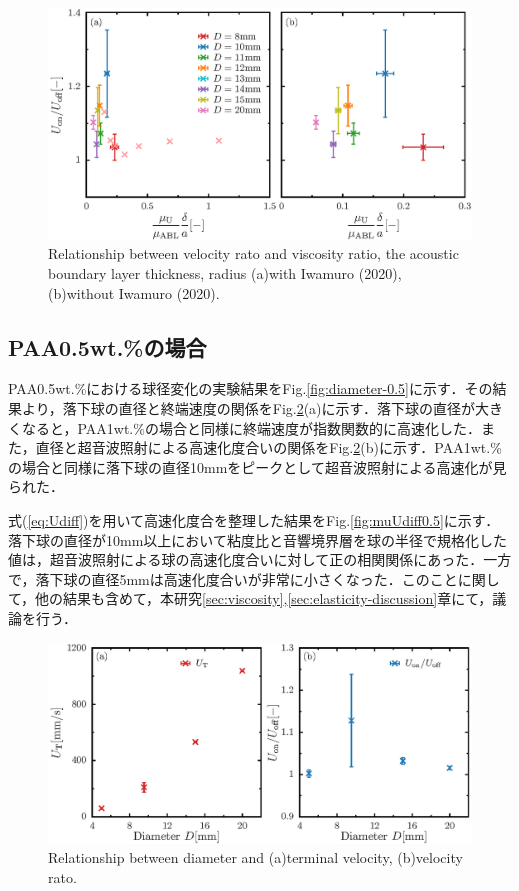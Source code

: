 \begin{figure}[ht]
    \centering
    \includegraphics[width=1\textwidth]{./5-Results/mu_Udiff.eps}
    \caption{Relationship between velocity rato and viscosity ratio, the acoustic boundary layer thickness, radius (a)with Iwamuro (2020), (b)without Iwamuro (2020).}
    \label{fig:muUdiff}
\end{figure}

\newpage

\subsection{PAA0.5wt.\%の場合}
PAA0.5wt.\%における球径変化の実験結果をFig.\ref{fig:diameter-0.5}に示す．その結果より，落下球の直径と終端速度の関係をFig.\ref{fig:diaUT0.5}(a)に示す．落下球の直径が大きくなると，PAA1wt.\%の場合と同様に終端速度が指数関数的に高速化した．また，直径と超音波照射による高速化度合いの関係をFig.\ref{fig:diaUT0.5}(b)に示す．PAA1wt.\%の場合と同様に落下球の直径10mmをピークとして超音波照射による高速化が見られた．

式(\ref{eq:Udiff})を用いて高速化度合を整理した結果をFig.\ref{fig:muUdiff0.5}に示す．落下球の直径が10mm以上において粘度比と音響境界層を球の半径で規格化した値は，超音波照射による球の高速化度合いに対して正の相関関係にあった．一方で，落下球の直径5mmは高速化度合いが非常に小さくなった．このことに関して，他の結果も含めて，本研究\ref{sec:viscosity},\ref{sec:elasticity-discussion}章にて，議論を行う．
\begin{figure}[ht]
    \centering
    \includegraphics[width=1\textwidth]{./5-Results/diameter-0.5/diaUT_Udiff.eps}
    \caption{Relationship between diameter and (a)terminal velocity, (b)velocity rato.}
    \label{fig:diaUT0.5}
\end{figure}

